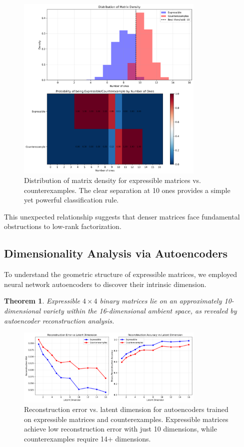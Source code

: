 \documentclass[11pt]{amsart}
\theoremstyle{plain}
\newtheorem{theorem}{Theorem}
\theoremstyle{definition}
\theoremstyle{remark}
\begin{document}
\begin{figure}[H]
\centering
\includegraphics[width=0.8\textwidth]{ones_analysis_detailed.png}
\caption{Distribution of matrix density for expressible matrices vs. counterexamples. The clear separation at 10 ones provides a simple yet powerful classification rule.}
\end{figure}

This unexpected relationship suggests that denser matrices face fundamental obstructions to low-rank factorization.

\subsection{Dimensionality Analysis via Autoencoders}

To understand the geometric structure of expressible matrices, we employed neural network autoencoders to discover their intrinsic dimension.

\begin{theorem}
Expressible $4 \times 4$ binary matrices lie on an approximately 10-dimensional variety within the 16-dimensional ambient space, as revealed by autoencoder reconstruction analysis.
\end{theorem}

\begin{figure}[H]
\centering
\includegraphics[width=0.8\textwidth]{autoencoder_dimension_analysis.png}
\caption{Reconstruction error vs. latent dimension for autoencoders trained on expressible matrices and counterexamples. Expressible matrices achieve low reconstruction error with just 10 dimensions, while counterexamples require 14+ dimensions.}
\end{figure}
\end{document}
